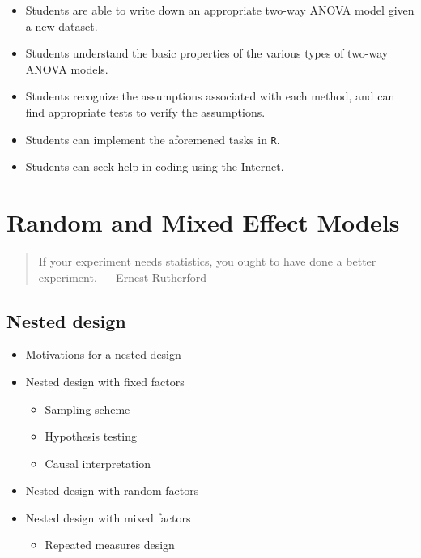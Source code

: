 \documentclass[12pt,]{book}
\providecommand{\tightlist}{%
  \setlength{\itemsep}{0pt}\setlength{\parskip}{0pt}}
\begin{document}
\begin{itemize}
\tightlist
\item
  Students are able to write down an appropriate two-way ANOVA model
  given a new dataset.
\item
  Students understand the basic properties of the various types of
  two-way ANOVA models.
\item
  Students recognize the assumptions associated with each method, and
  can find appropriate tests to verify the assumptions.
\item
  Students can implement the aforemened tasks in \texttt{R}.
\item
  Students can seek help in coding using the Internet.
\end{itemize}

\chapter{Random and Mixed Effect Models}\label{ch:nested}

\begin{quote}
If your experiment needs statistics, you ought to have done a better
experiment. --- Ernest Rutherford
\end{quote}

\section{Nested design}\label{nested-design}

\begin{itemize}
\tightlist
\item
  Motivations for a nested design
\item
  Nested design with fixed factors

  \begin{itemize}
  \tightlist
  \item
    Sampling scheme
  \item
    Hypothesis testing
  \item
    Causal interpretation
  \end{itemize}
\item
  Nested design with random factors
\item
  Nested design with mixed factors

  \begin{itemize}
  \tightlist
  \item
    Repeated measures design
  \end{itemize}
\end{itemize}
\end{document}
